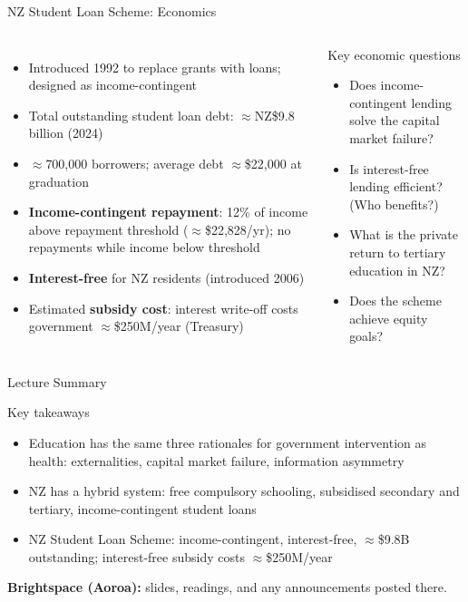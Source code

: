 \documentclass[aspectratio=169, 12pt]{beamer}
\newcommand{\summaryside}[1]{%
  \begin{frame}{Lecture Summary}
    \begin{exampleblock}{Key takeaways}
      \begin{itemize}#1\end{itemize}
    \end{exampleblock}
    \vspace{0.5em}
    {\footnotesize\textcolor{OtagoGold}{\textbf{Brightspace (Aoroa):}} slides, readings, and any announcements posted there.}
  \end{frame}}
\begin{document}
\begin{frame}{NZ Student Loan Scheme: Economics}
  \begin{columns}
      \begin{itemize}
        \item Introduced 1992 to replace grants with loans; designed as income-contingent
        \item Total outstanding student loan debt: $\approx$NZ\$9.8 billion (2024)
        \item $\approx$700,000 borrowers; average debt $\approx$\$22,000 at graduation
        \item \textbf{Income-contingent repayment}: 12\% of income above repayment threshold
              ($\approx$\$22,828/yr); no repayments while income below threshold
        \item \textbf{Interest-free} for NZ residents (introduced 2006)
        \item Estimated \textbf{subsidy cost}: interest write-off costs government
              $\approx$\$250M/year (Treasury)
      \end{itemize}
      \begin{alertblock}{Key economic questions}
        \begin{itemize}
          \item Does income-contingent lending solve the capital market failure?
          \item Is interest-free lending efficient? (Who benefits?)
          \item What is the private return to tertiary education in NZ?
          \item Does the scheme achieve equity goals?
        \end{itemize}
      \end{alertblock}
  \end{columns}
\end{frame}

\summaryside{
  \item Education has the same three rationales for government intervention as health: externalities, capital market failure, information asymmetry
  \item NZ has a hybrid system: free compulsory schooling, subsidised secondary and tertiary, income-contingent student loans
  \item NZ Student Loan Scheme: income-contingent, interest-free, $\approx$\$9.8B outstanding; interest-free subsidy costs $\approx$\$250M/year
}
\end{document}
